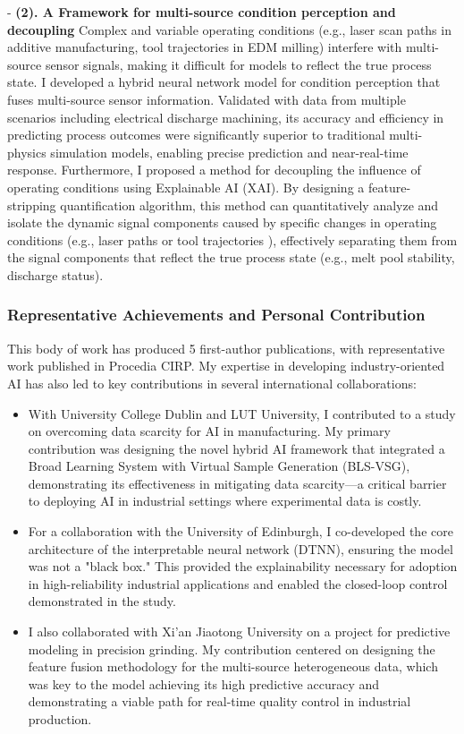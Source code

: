 \documentclass{ResearchStatement}
\begin{document}
- \textbf{(2). A Framework for multi-source condition perception and decoupling}
Complex and variable operating conditions (e.g., laser scan paths in additive manufacturing, tool trajectories in EDM milling) interfere with multi-source sensor signals, making it difficult for models to reflect the true process state. I developed a hybrid neural network model for condition perception that fuses multi-source sensor information. Validated with data from multiple scenarios including electrical discharge machining, its accuracy and efficiency in predicting process outcomes were significantly superior to traditional multi-physics simulation models, enabling precise prediction and near-real-time response. Furthermore, I proposed a method for decoupling the influence of operating conditions using Explainable AI (XAI). By designing a feature-stripping quantification algorithm, this method can quantitatively analyze and isolate the dynamic signal components caused by specific changes in operating conditions (e.g., laser paths or tool trajectories ), effectively separating them from the signal components that reflect the true process state (e.g., melt pool stability, discharge status).

\subsubsection{Representative Achievements and Personal Contribution}
This body of work has produced 5 first-author publications, with representative work published in Procedia CIRP. My expertise in developing industry-oriented AI has also led to key contributions in several international collaborations:
\begin{itemize}
    \item With University College Dublin and LUT University, I contributed to a study on overcoming data scarcity for AI in manufacturing. My primary contribution was designing the novel hybrid AI framework that integrated a Broad Learning System with Virtual Sample Generation (BLS-VSG), demonstrating its effectiveness in mitigating data scarcity—a critical barrier to deploying AI in industrial settings where experimental data is costly.
    \item For a collaboration with the University of Edinburgh, I co-developed the core architecture of the interpretable neural network (DTNN), ensuring the model was not a "black box." This provided the explainability necessary for adoption in high-reliability industrial applications and enabled the closed-loop control demonstrated in the study.
    \item I also collaborated with Xi'an Jiaotong University on a project for predictive modeling in precision grinding. My contribution centered on designing the feature fusion methodology for the multi-source heterogeneous data, which was key to the model achieving its high predictive accuracy and demonstrating a viable path for real-time quality control in industrial production.
\end{itemize}
\end{document}
